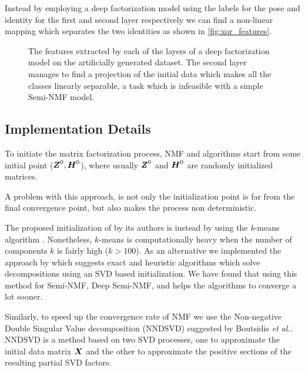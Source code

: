 \documentclass[10pt,journal,compsoc]{IEEEtran}
\def\etal{{\it et al.}}
\begin{document}
Instead by employing a deep factorization model using the labels for the pose and identity for the first and second layer respectively we can find a non-linear mapping which separates the two identities as shown in \autoref{fig:xor_features}.

\vspace{-0.3cm}
\begin{figure}[h]
\centering
{}
\caption{The features extracted by each of the layers of a deep factorization model on the artificially generated dataset. The second layer manages to find a projection of the initial data which makes all the classes linearly separable, a task which is infeasible with a simple Semi-NMF model.} \label{fig:xor_features}
\end{figure}



\subsection{Implementation Details}
To initiate the matrix factorization process, NMF and \seminmf algorithms start from some initial point ($\boldsymbol Z^0, \boldsymbol H^0$), where usually $\boldsymbol Z^0$ and $\boldsymbol H^0$ are randomly initialized matrices. 

A problem with this approach, is not only the initialization point is far from the final convergence point, but also makes the process non deterministic.

The proposed initialization of \seminmf by its authors is instead by using the \emph{k}-means algorithm \cite{Ding2010}. Nonetheless, $k$-means is computationally heavy when the number of components $k$ is fairly high ($k>100$). As an alternative we implemented the approach by \cite{gillis2014exact} which suggests exact and heuristic algorithms which solve \seminmf decompositions using an SVD based initialization. We have found that using this method for Semi-NMF, Deep Semi-NMF, and \wsf{} helps the algorithms to converge a lot sooner.

Similarly, to speed up the convergence rate of NMF we use the Non-negative Double Singular Value decomposition (NNDSVD) suggested by Boutsidis \etal \citet{boutsidis2008svd}. NNDSVD is a method based on
two SVD processes, one to approximate the initial data matrix $\boldsymbol X$ and the other to approximate the positive sections of the resulting partial SVD factors. 
\end{document}
